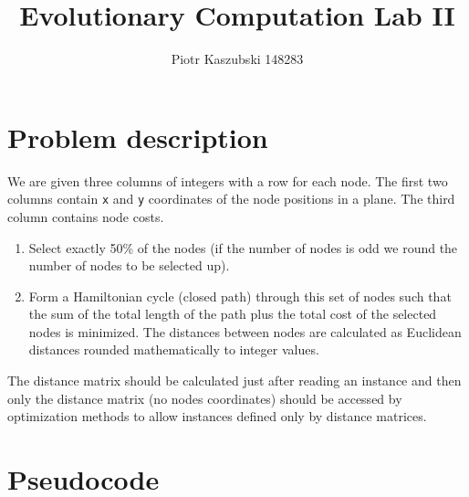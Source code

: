 \documentclass[14pt]{article}
\title{Evolutionary Computation Lab II}
\author{Piotr Kaszubski 148283}
\date{}
\begin{document}
\maketitle
\tableofcontents
\newpage

\section{Problem description}
We are given three columns of integers with a row for each node. The first two
columns contain \verb`x` and \verb`y` coordinates of the node positions in a
plane. The third column contains node costs.

\begin{enumerate}
	\item Select exactly 50\% of the nodes (if the number of nodes is odd we
		round the number of nodes to be selected up).
	\item Form a Hamiltonian cycle (closed path) through this set of nodes such
		that the sum of the total length of the path plus the total cost of the
		selected nodes is minimized. The distances between nodes are calculated
		as Euclidean distances rounded mathematically to integer values.
\end{enumerate}

The distance matrix should be calculated just after reading an instance and
then only the distance matrix (no nodes coordinates) should be accessed by
optimization methods to allow instances defined only by distance matrices.

\section{Pseudocode}
\end{document}
